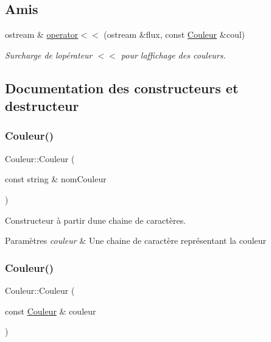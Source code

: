 \subsection*{Amis}
\begin{DoxyCompactItemize}
\item 
ostream \& \mbox{\hyperlink{class_couleur_a8223b4eee2017fdd318d16692a16c636}{operator$<$$<$}} (ostream \&flux, const \mbox{\hyperlink{class_couleur}{Couleur}} \&coul)
\begin{DoxyCompactList}\small\item\em Surcharge de l\textquotesingle{}opérateur $<$$<$ pour l\textquotesingle{}affichage des couleurs. \end{DoxyCompactList}\end{DoxyCompactItemize}


\subsection{Documentation des constructeurs et destructeur}
\mbox{\label{class_couleur_a3875e178605e5a425a473b9034f796b3}} 
\subsubsection{\texorpdfstring{Couleur()}{Couleur()}\hspace{0.1cm}{\footnotesize\ttfamily [1/2]}}
{\footnotesize\ttfamily Couleur\+::\+Couleur (\begin{DoxyParamCaption}\item[{const string \&}]{nom\+Couleur }\end{DoxyParamCaption})}



Constructeur à partir d\textquotesingle{}une chaine de caractères. 


\begin{DoxyParams}{Paramètres}
{\em couleur} & Une chaine de caractère représentant la couleur \\
\hline
\end{DoxyParams}
\mbox{\label{class_couleur_ae5694f3994756524981394433bbdc85f}} 
\subsubsection{\texorpdfstring{Couleur()}{Couleur()}\hspace{0.1cm}{\footnotesize\ttfamily [2/2]}}
{\footnotesize\ttfamily Couleur\+::\+Couleur (\begin{DoxyParamCaption}\item[{const \mbox{\hyperlink{class_couleur}{Couleur}} \&}]{couleur }\end{DoxyParamCaption})}



